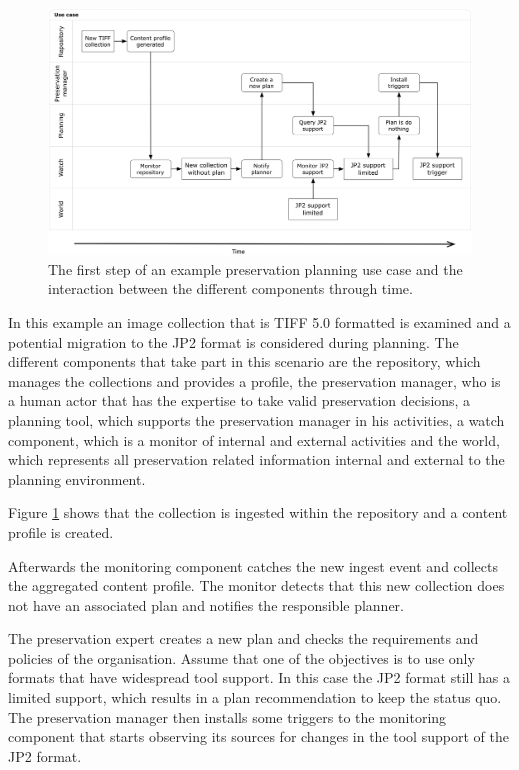 \begin{figure}[th]
\begin{center}
\includegraphics[width=6in]{figures/related/swimlane_step1.png}
\caption{The first step of an example preservation planning use case and the interaction between the different components through time.}
\label{fig:swimlane_step1}
\end{center}
\end{figure}

In this example an image collection that is TIFF 5.0 formatted is examined and a potential migration to the JP2 format is considered during planning. The different components that take part in this scenario are the repository, which manages the collections and provides a profile, the preservation manager, who is a human actor that has the expertise to take valid preservation decisions, a planning tool, which supports the preservation manager in his activities, a watch component, which is a monitor of internal and external activities and the world, which represents all preservation related information internal and external to the planning environment.

Figure \ref{fig:swimlane_step1} shows that the collection is ingested within the repository and a content profile is created.

Afterwards the monitoring component catches the new ingest event and collects the aggregated content profile. The monitor detects that this new collection does not have an associated plan and notifies the responsible planner.

The preservation expert creates a new plan and checks the requirements and policies of the organisation. Assume that one of the objectives is to use only formats that have widespread tool support. In this case the JP2 format still has a limited support, which results in a plan recommendation to keep the status quo. The preservation manager then installs some triggers to the monitoring component that starts observing its sources for changes in the tool support of the JP2 format.

